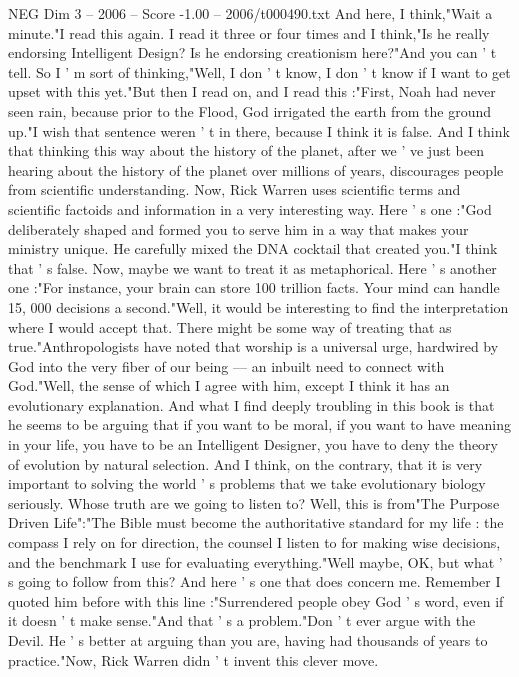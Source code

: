 \begin{textsample}{NEG Dim 3 – 2006 – Score -1.00 – 2006/t000490.txt}
And here, I think,"Wait a minute."I read this again.
I read it three or four times and I think,"Is he really endorsing Intelligent Design?
Is he endorsing creationism here?"And you can ' t tell.
So I ' m sort of thinking,"Well, I don ' t know, I don ' t know if I want to get upset with this yet."But then I read on, and I read this :"First, Noah had never seen rain, because prior to the Flood, God irrigated the earth from the ground up."I wish that sentence weren ' t in there, because I think it is false.
And I think that thinking this way about the history of the planet, after we ' ve just been hearing about the history of the planet over millions of years, discourages people from scientific understanding.
Now, Rick Warren uses scientific terms and scientific factoids and information in a very interesting way.
Here ' s one :"God deliberately shaped and formed you to serve him in a way that makes your ministry unique.
He carefully mixed the DNA cocktail that created you."I think that ' s false.
Now, maybe we want to treat it as metaphorical.
Here ' s another one :"For instance, your brain can store 100 trillion facts.
Your mind can handle 15, 000 decisions a second."Well, it would be interesting to find the interpretation where I would accept that.
There might be some way of treating that as true."Anthropologists have noted that worship is a universal urge, hardwired by God into the very fiber of our being — an inbuilt need to connect with God."Well, the sense of which I agree with him, except I think it has an evolutionary explanation.
And what I find deeply troubling in this book is that he seems to be arguing that if you want to be moral, if you want to have meaning in your life, you have to be an Intelligent Designer, you have to deny the theory of evolution by natural selection.
And I think, on the contrary, that it is very important to solving the world ' s problems that we take evolutionary biology seriously.
Whose truth are we going to listen to?
Well, this is from"The Purpose Driven Life":"The Bible must become the authoritative standard for my life : the compass I rely on for direction, the counsel I listen to for making wise decisions, and the benchmark I use for evaluating everything."Well maybe, OK, but what ' s going to follow from this?
And here ' s one that does concern me.
Remember I quoted him before with this line :"Surrendered people obey God ' s word, even if it doesn ' t make sense."And that ' s a problem."Don ' t ever argue with the Devil.
He ' s better at arguing than you are, having had thousands of years to practice."Now, Rick Warren didn ' t invent this clever move.

\end{textsample}
